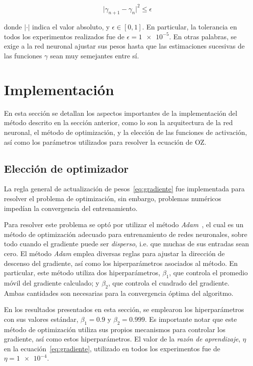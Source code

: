 \begin{equation}
    {\lvert \gamma_{n+1} - \gamma_{n} \rvert}^2 \leq \epsilon
    \label{eq:tolerancia}
\end{equation}

donde $\lvert \cdot \rvert$ indica el valor absoluto, y $\epsilon \in [0, 1]$.
En particular, la tolerancia en todos los experimentos realizados fue de
$\epsilon = \num{1e-5}$.
En otras palabras, se exige a la red neuronal ajustar sus pesos hasta que las estimaciones
sucesivas de las funciones $\gamma$ sean muy semejantes entre sí.

\section{Implementación}
En esta sección se detallan los aspectos importantes de la implementación del método
descrito en la sección anterior, como lo son la arquitectura de la red neuronal, el método
de optimización, y la elección de las funciones de activación, así como los parámetros
utilizados para resolver la ecuación de OZ.

\subsection{Elección de optimizador}
La regla general de actualización de pesos~\eqref{eq:gradiente} fue implementada para 
resolver el problema de optimización, sin embargo, problemas numéricos impedían la
convergencia del entrenamiento.

Para resolver este problema se optó por utilizar el método \emph{Adam}~\cite{kingmaAdamMethodStochastic2017},
el cual es un método de optimización adecuado para entrenamiento de redes neuronales,
sobre todo cuando el gradiente puede ser \emph{disperso}, i.e. que muchas de sus entradas
sean cero.
El método \emph{Adam} emplea diversas reglas para ajustar la dirección de descenso del
gradiente, así como los hiperparámetros asociados al método. En particular, este método
utiliza dos hiperparámetros, $\beta_1$, que controla el promedio móvil
del gradiente calculado; y $\beta_2$, que controla el cuadrado del gradiente. Ambas
cantidades son necesarias para la convergencia óptima del algoritmo.

En los resultados presentados en esta sección, se emplearon los hiperparámetros con sus
valores estándar, $\beta_1=0.9$ y $\beta_2=0.999$. Es importante notar que este método
de optimización utiliza sus propios mecanismos para controlar los gradiente, así como
estos hiperparámetros. El valor de la \emph{razón de aprendizaje}, $\eta$
en la ecuación~\eqref{eq:gradiente}, utilizado en todos los experimentos fue de
$\eta=\num{1e-4}$.

